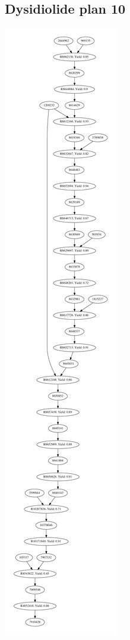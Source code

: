 \documentclass[a4paper,10pt,titlepage]{paper}
\begin{document}
\subsection{Dysidiolide plan 10}
\centering
\includegraphics[scale=0.4]{Synteseplaner/Dysidiolide/plan10.pdf}
\label{Appendix::Dysidiolide10}
\end{document}
